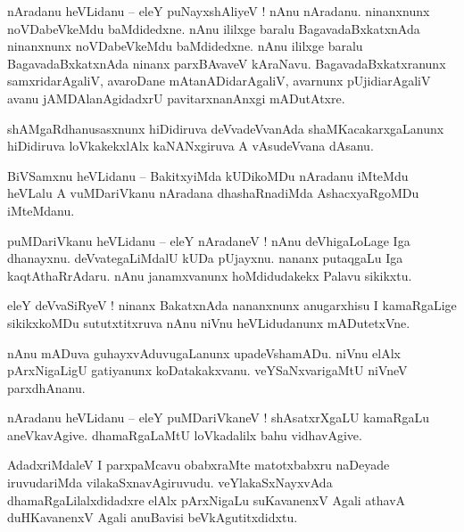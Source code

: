 \documentclass{article}
\begin{document}
\begin{mn}%
nAradanu heVLidanu -- eleY puNayxshAliyeV ! nAnu nAradanu. ninanxnunx noVDabeVkeMdu baMdidedxne. 
nAnu ililxge baralu BagavadaBxkatxnAda ninanxnunx noVDabeVkeMdu baMdidedxne. nAnu ililxge baralu 
BagavadaBxkatxnAda ninanx parxBAvaveV kAraNavu. BagavadaBxkatxranunx samxridarAgaliV, avaroDane 
mAtanADidarAgaliV, avarnunx pUjidiarAgaliV avanu jAMDAlanAgidadxrU pavitarxnanAnxgi mADutAtxre.
\end{mn}

\begin{mn}%
shAMgaRdhanusasxnunx hiDidiruva deVvadeVvanAda shaMKacakarxgaLanunx hiDidiruva loVkakekxlAlx 
kaNANxgiruva A vAsudeVvana dAsanu.
\end{mn}

\begin{mn}%
BiVSamxnu heVLidanu -- BakitxyiMda kUDikoMDu nAradanu iMteMdu heVLalu A vuMDariVkanu nAradana 
dhashaRnadiMda AshacxyaRgoMDu iMteMdanu.
\end{mn}

\begin{mn}%
puMDariVkanu heVLidanu -- eleY nAradaneV ! nAnu deVhigaLoLage Iga dhanayxnu. deVvategaLiMdalU kUDa 
pUjayxnu. nananx putaqgaLu Iga kaqtAthaRrAdaru. nAnu janamxvanunx hoMdidudakekx Palavu sikikxtu.
\end{mn}

\begin{mn}%
eleY deVvaSiRyeV ! ninanx BakatxnAda nananxnunx anugarxhisu I kamaRgaLige sikikxkoMDu 
sututxtitxruva nAnu niVnu heVLidudanunx mADutetxVne.
\end{mn}

\begin{mn}%
nAnu mADuva guhayxvAduvugaLanunx upadeVshamADu. niVnu elAlx pArxNigaLigU gatiyanunx koDatakakxvanu. 
veYSaNxvarigaMtU niVneV parxdhAnanu.
\end{mn}

\begin{mn}%
nAradanu heVLidanu -- eleY puMDariVkaneV ! shAsatxrXgaLU kamaRgaLu aneVkavAgive. dhamaRgaLaMtU 
loVkadalilx bahu vidhavAgive.
\end{mn}

\begin{mn}%
AdadxriMdaleV I parxpaMcavu obabxraMte matotxbabxru naDeyade iruvudariMda vilakaSxnavAgiruvudu. 
veYlakaSxNayxvAda dhamaRgaLilalxdidadxre elAlx pArxNigaLu suKavanenxV Agali athavA duHKavanenxV 
Agali anuBavisi beVkAgutitxdidxtu.
\end{mn}
\end{document}
